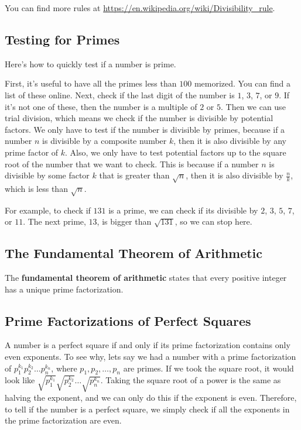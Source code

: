 \documentclass{article}
\begin{document}
\begin{multicols}{2}
	You can find more rules at \url{https://en.wikipedia.org/wiki/Divisibility_rule}.
	
	\subsection*{Testing for Primes}
	Here's how to quickly test if a number is prime.
	
	First, it's useful to have all the primes less than $100$ memorized.
	You can find a list of these online.
	Next, check if the last digit of the number is $1$, $3$, $7$, or $9$.
	If it's not one of these, then the number is a multiple of $2$ or $5$.
	Then we can use trial division, which means we check if the number is divisible
	by potential factors.
	We only have to test if the number is divisible by primes,
	because if a number $n$ is divisible by a composite number $k$,
	then it is also divisible by any prime factor of $k$.
	Also, we only have to test potential factors up to the square root of the number
	that we want to check.
	This is because if a number $n$ is divisible by some factor $k$ that is greater than $\sqrt{n}$,
	then it is also divisible by $\frac{n}{k}$, which is less than $\sqrt{n}$.
	
	For example, to check if $131$ is a prime, we can check if its divisible by
	$2$, $3$, $5$, $7$, or $11$.
	The next prime, $13$, is bigger than $\sqrt{131}$, so we can stop here.
	
	\subsection*{The Fundamental Theorem of Arithmetic}
	The \textbf{fundamental theorem of arithmetic} states that every positive integer
	has a unique prime factorization.
	
	\subsection*{Prime Factorizations of Perfect Squares}
	A number is a perfect square if and only if its prime factorization contains only
	even exponents.
	To see why, lets say we had a number with a prime factorization of
	$p_1^{k_1} p_2^{k_2} \dots p_n^{k_n}$, where $p_1, p_2, \dots, p_n$ are primes.
	If we took the square root, it would look like
	$\sqrt{p_1^{k_1}} \sqrt{p_2^{k_2}} \dots \sqrt{p_n^{k_n}}$.
	Taking the square root of a power is the same as halving the exponent,
	and we can only do this if the exponent is even.
	Therefore, to tell if the number is a perfect square, we simply check if all the exponents
	in the prime factorization are even.
	

\end{multicols}
\end{document}
